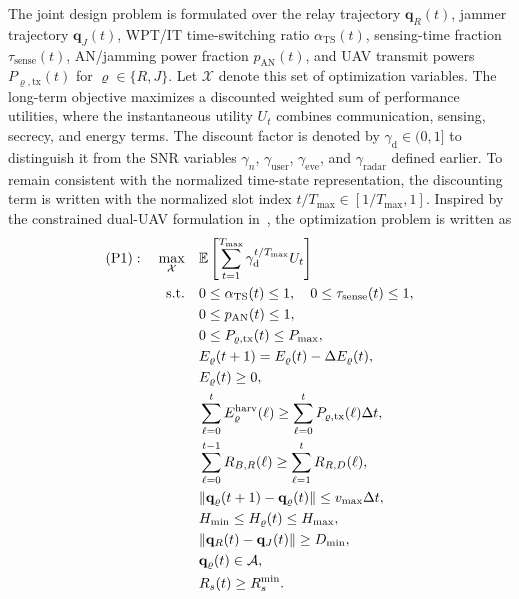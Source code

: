\documentclass[journal]{IEEEtran}
\begin{document}
The joint design problem is formulated over the relay trajectory $\mathbf{q}_R(t)$, jammer trajectory $\mathbf{q}_J(t)$, WPT/IT time-switching ratio $\alpha_{\text{TS}}(t)$, sensing-time fraction $\tau_{\text{sense}}(t)$, AN/jamming power fraction $p_{\text{AN}}(t)$, and UAV transmit powers $P_{\varrho,\text{tx}}(t)$ for $\varrho\in\{R,J\}$. Let $\mathcal{X}$ denote this set of optimization variables. The long-term objective maximizes a discounted weighted sum of performance utilities, where the instantaneous utility $U_t$ combines communication, sensing, secrecy, and energy terms. The discount factor is denoted by $\gamma_{\text{d}}\in(0,1]$ to distinguish it from the SNR variables $\gamma_n$, $\gamma_{\text{user}}$, $\gamma_{\text{eve}}$, and $\gamma_{\text{radar}}$ defined earlier. To remain consistent with the normalized time-state representation, the discounting term is written with the normalized slot index $t/T_{\max}\in[1/T_{\max},1]$. Inspired by the constrained dual-UAV formulation in~\cite{pandeydualuav2026}, the optimization problem is written as
\begin{align}
(\text{P1}):\quad
\max_{\mathcal{X}} \quad
& \mathbb{E}\left[\sum_{t=1}^{T_{\max}} \gamma_{\text{d}}^{t/T_{\max}} U_t\right] \label{eq:problem}\\
\text{s.t.}\quad
& 0 \leq \alpha_{\text{TS}}(t) \leq 1,\quad
  0 \leq \tau_{\text{sense}}(t) \leq 1, \notag\\
& 0 \leq p_{\text{AN}}(t) \leq 1, \label{eq:c_tsr}\\
& 0 \leq P_{\varrho,\text{tx}}(t) \leq P_{\max}, \label{eq:c_power}\\
& E_{\varrho}(t+1)=E_{\varrho}(t)-\Delta E_{\varrho}(t), \notag\\
& E_{\varrho}(t)\geq 0, \label{eq:c_battery}\\
& \sum_{\ell=0}^{t}E_{\varrho}^{\text{harv}}(\ell)
  \geq
  \sum_{\ell=0}^{t}P_{\varrho,\text{tx}}(\ell)\Delta t, \label{eq:c_energy_causality}\\
& \sum_{\ell=0}^{t-1}R_{B,R}(\ell)
  \geq
  \sum_{\ell=1}^{t}R_{R,D}(\ell), \label{eq:c_info_causality}\\
& \|\mathbf{q}_{\varrho}(t+1)-\mathbf{q}_{\varrho}(t)\|
  \leq v_{\max}\Delta t, \label{eq:c_speed}\\
& H_{\min} \leq H_{\varrho}(t) \leq H_{\max}, \label{eq:c_altitude}\\
& \|\mathbf{q}_{R}(t)-\mathbf{q}_{J}(t)\| \geq D_{\min}, \label{eq:c_collision}\\
& \mathbf{q}_{\varrho}(t)\in\mathcal{A}, \label{eq:c_area}\\
& R_s(t) \geq R_s^{\min}. \label{eq:c_secrecy}
\end{align}
\end{document}
